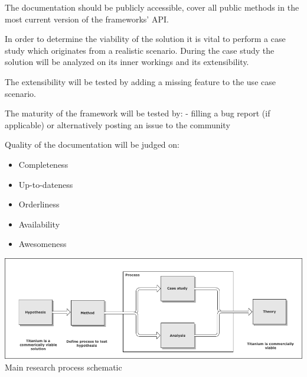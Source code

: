 The documentation should be publicly accessible, cover all public methods in the most current version of the frameworks' API.

%
%

In order to determine the viability of the solution it is vital to perform a case study which originates from a realistic scenario. During the case study the solution will be analyzed on its inner workings and its extensibility.

The extensibility will be tested by adding a missing feature to the use case scenario.

The maturity of the framework will be tested by:
- filling a bug report (if applicable) or alternatively posting an issue to the community



Quality of the documentation will be judged on:
\begin{itemize}
	\item Completeness
	\item Up-to-dateness
	\item Orderliness
	\item Availability
	\item Awesomeness
\end{itemize}



\begin{centering}
\includegraphics[scale=0.5]{images/process.png}\\{Main research process schematic}\\
\end{centering}

